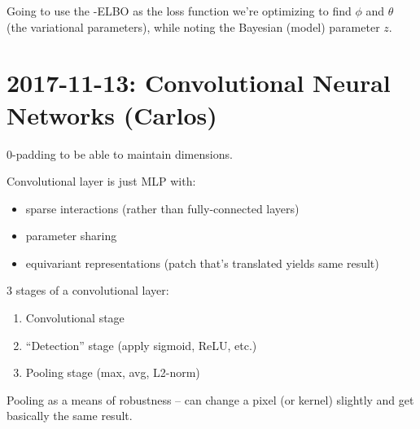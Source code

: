 \documentclass{article}
\begin{document}
Going to use the -ELBO as the loss function we're optimizing to find $\phi$ and $\theta$ (the variational parameters), while
noting the Bayesian (model) parameter $z$.

\section{2017-11-13: Convolutional Neural Networks (Carlos)}
0-padding to be able to maintain dimensions.

Convolutional layer is just MLP with:
\begin{itemize}
  \item sparse interactions (rather than fully-connected layers)
  \item parameter sharing
  \item equivariant representations (patch that's translated yields same result)
\end{itemize}

3 stages of a convolutional layer:
\begin{enumerate}
  \item Convolutional stage
  \item ``Detection'' stage (apply sigmoid, ReLU, etc.)
  \item Pooling stage (max, avg, L2-norm)
\end{enumerate}

Pooling as a means of robustness -- can change a pixel (or kernel) slightly and get basically the same result.
\end{document}
